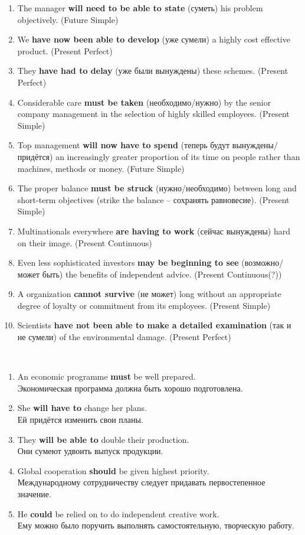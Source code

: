 \documentclass[main.tex]{subfiles}
\begin{document}
\begin{enumerate}[nosep,leftmargin=*]
	\item The manager \textbf{will need to be able to state} (суметь) his problem objectively. (Future Simple)
	\item We \textbf{have now been able to develop} (уже сумели) a highly cost effective product. (Present Perfect)
	\item They \textbf{have had to delay} (уже были вынуждены) these schemes. (Present Perfect)
	\item Considerable care \textbf{must be taken} (необходимо/нужно) by the senior company management in the selection of highly skilled employees. (Present Simple)
	\item Top management \textbf{will now have to spend} (теперь будут вынуждены/придётся) an increasingly greater proportion of its time on people rather than machines, methods or money. (Future Simple)
	\item The proper balance \textbf{must be struck} (нужно/необходимо) between long and short-term objectives (strike the balance -- сохранять равновесие). (Present Simple)
	\item Multinationals everywhere \textbf{are having to work} (сейчас вынуждены) hard on their image. (Present Continuous)
	\item Even less sophisticated investors \textbf{may be beginning to see} (возможно/может быть) the benefits of independent advice. (Present Continuous(?))
	\item A organization \textbf{cannot survive} (не может) long without an appropriate degree of loyalty or commitment from its employees. (Present Simple)
	\item Scientists \textbf{have not been able to make a detailed examination} (так и не сумели) of the environmental damage. (Present Perfect)
\end{enumerate}
\


\begin{enumerate}[nosep,leftmargin=*]
	\item An economic programme \textbf{must} be well prepared.\\
	Экономическая программа должна быть хорошо подготовлена.
	\item She \textbf{will have to} change her plans.\\
	Ей придётся изменить свои планы.
	\item They \textbf{will be able to} double their production.\\
	Они сумеют удвоить выпуск продукции.
	\item Global cooperation \textbf{should} be given highest priority.\\
	Международному сотрудничеству следует придавать первостепенное значение.
	\item He \textbf{could} be relied on to do independent creative work.\\
	Ему можно было поручить выполнять самостоятельную, творческую работу.
\end{enumerate}
\end{document}
